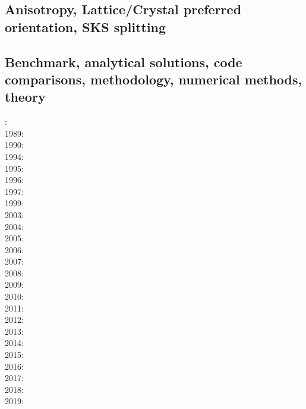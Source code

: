 \subsection{Anisotropy, Lattice/Crystal preferred orientation, SKS splitting}


\cite{faca13}
\cite{facc14}

\subsection*{Benchmark, analytical solutions, code comparisons, methodology, numerical methods, theory}

: \cite{yusa84}\\
1989: \cite{blbc89}\\
1990: \cite{trab90}\\
1994: \cite{brsa94}\\
1995: \cite{brsa95}\cite{moso95}\\
1996: \cite{zhon96}\cite{mozg96}\\
1997: \cite{rist97}\\
1999: \cite{lind99}\\
2003: \cite{taki03}\cite{modm03}\\
2004: \cite{kaps04}\cite{kasa04}\cite{kaks08}\\
2005: \cite{mure05}\\
2006: \cite{kapo06}\cite{more06}\\
2007: \cite{toma07}\cite{chcc07}\cite{kabe07}\cite{kaks07}\cite{moql07}\\
2008: \cite{zhmt08}\cite{deka08}\cite{trub08}\cite{krdp08}\\
2009: \cite{king09}\\
2010: \cite{kaus10}\cite{kamm10}\\
2011: \cite{dumg11}\cite{uibb11}\\
2012: \cite{crsg12}\cite{chgv12}\cite{krwd12}\cite{may12}\\
2013: \cite{chtl13}\cite{kemk13}\\
2014: \cite{thmk14}\\
2015: \cite{lelk15}\cite{rumi15}\cite{chpe15}\\
2016: \cite{dumy16}\cite{blmp16}\\
2017: \cite{robh17}\cite{wisv17}\\
2018: \cite{memm18}\\
2019: \cite{clhe19}

